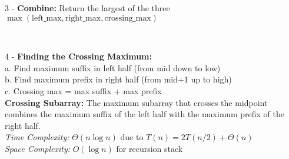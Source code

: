 \documentclass[a4paper]{extarticle}
\newcommand{\algofont}{\fontsize{4.3pt}{4.7pt}\selectfont}
\newcommand{\algocode}[1]{%
  \vspace{0pt}%
  \begin{algorithm}[H]
    \setlength{\abovecaptionskip}{0pt}%
    \setlength{\belowcaptionskip}{0pt}
    \setlength{\intextsep}{0pt}%
    \setlength{\textfloatsep}{0pt}
    \algofont  %
  \end{algorithm}%
  \vspace{0pt}%
}
\begin{document}
\begin{paracol}{3}
{\begin{minipage}[t]{0.44\textwidth}
\begin{minipage}[t]{0.4\textwidth}
\begin{itemize}[leftmargin=0pt,itemsep=0pt,topsep=0pt,parsep=0pt]
  \end{itemize}
  3 - \textbf{Combine:} Return the largest of the three\\
  $\max(\text{left\_max}, \text{right\_max}, \text{crossing\_max})$\\
  \end{minipage}%
  \begin{minipage}[t]{0.56\textwidth}
    \vspace{-15px}
      \algocode{max-subarray}\vspace*{-35px}
  \end{minipage}\\
  \begin{minipage}[t]{0.5\textwidth}
  4 - \textbf{Finding the Crossing Maximum:}\\
  a. Find maximum suffix in left half (from mid down to low)\\
  b. Find maximum prefix in right half (from mid+1 up to high)\\
  c. Crossing max = max suffix + max prefix\\[1pt]
  \textbf{Crossing Subarray:} The maximum subarray that crosses the midpoint combines the maximum suffix of the left half with the maximum prefix of the right half.\\[2pt]
  \textit{Time Complexity:} $\Theta(n\log n)$ due to $T(n) = 2T(n/2) + \Theta(n)$\\
  \textit{Space Complexity:} $O(\log n)$ for recursion stack\\[2pt]
  \end{minipage}
  \begin{minipage}[t]{0.5\textwidth}
    \vspace{-20px}
  \algocode{max-subarray-crossing}
  \end{minipage}\vspace*{-23px}
  \end{minipage}%
  }\\
\end{paracol}
\end{document}
